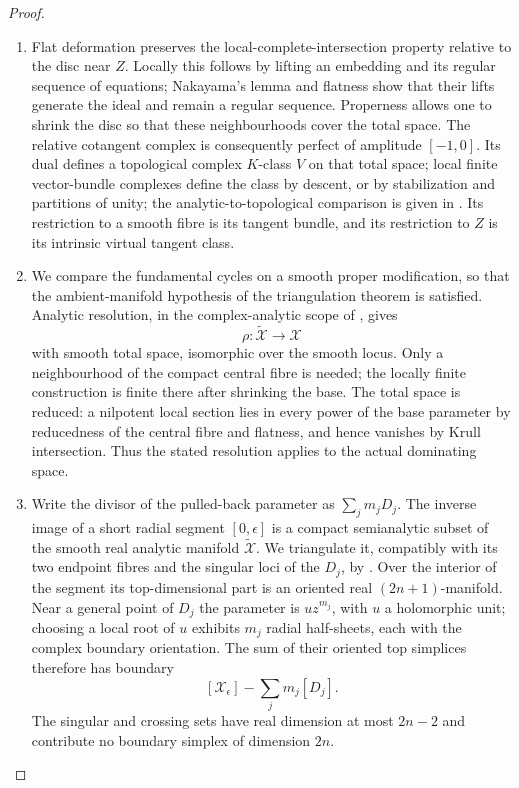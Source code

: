 \begin{proof}
\begin{enumerate}[label=\arabic*.,leftmargin=*]
\item Flat deformation preserves the local-complete-intersection
property relative to the disc near $Z$. Locally this follows by
lifting an embedding and its regular sequence of equations;
Nakayama's lemma and flatness show that their lifts generate
the ideal and remain a regular sequence. Properness allows one
to shrink the disc so that these neighbourhoods cover the total
space. The relative cotangent complex is consequently perfect
of amplitude $[-1,0]$. Its dual defines a topological complex
$K$-class $V$ on that total space; local finite vector-bundle
complexes define the class by descent, or by stabilization and
partitions of unity; the analytic-to-topological comparison is
given in \cite[Lemmas 3.1--3.2 and Section 3.1]{Levy08}.
Its restriction to a smooth fibre is its
tangent bundle, and its restriction to $Z$ is its intrinsic
virtual tangent class.

\item We compare the fundamental cycles on a smooth proper modification,
so that the ambient-manifold hypothesis of the triangulation theorem
is satisfied. Analytic resolution, in the complex-analytic scope of
\cite[Section~0.2(2), p.~3; Theorem~1.6 and its noncompact extension,
p.~5; Remark~1.16, p.~11]{BM95AB}, gives
\[
 \rho:\widetilde{\mathcal X}\longrightarrow\mathcal X
\]
with smooth total space, isomorphic over the smooth locus. Only a
neighbourhood of the compact central fibre is needed; the locally
finite construction is finite there after shrinking the base.
The total space is reduced: a nilpotent local section lies in every
power of the base parameter by reducedness of the central fibre and
flatness, and hence vanishes by Krull intersection. Thus the stated
resolution applies to the actual dominating space.

\item Write the divisor of the pulled-back parameter as
$\sum_j m_jD_j$. The inverse image of a short radial segment
$[0,\epsilon]$ is a compact semianalytic subset of the smooth real
analytic manifold $\widetilde{\mathcal X}$. We triangulate it,
compatibly with its two endpoint fibres and the singular loci of the
$D_j$, by \cite[Section~3, Theorems~1--2, pp.~463--464]{Loj64}.
Over the interior of the segment its top-dimensional part is an
oriented real $(2n+1)$-manifold. Near a general point of $D_j$ the
parameter is $u z^{m_j}$, with $u$ a holomorphic unit; choosing a
local root of $u$ exhibits $m_j$ radial half-sheets, each with the
complex boundary orientation. The sum of their oriented top
simplices therefore has boundary
\[
 [\mathcal X_\epsilon]-\sum_jm_j[D_j].
\]
The singular and crossing sets have real dimension at most $2n-2$
and contribute no boundary simplex of dimension $2n$.


\end{enumerate}
\end{proof}
